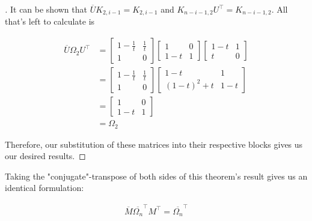 \begin{proof}[\cite{Kassel}]
It can be shown that $\overline{U}K_{2,i-1} = K_{2,i-1}$ and $K_{n-i-1,2}U^\intercal=K_{n-i-1,2}$. All that's left to calculate is 


\begin{equation}
	\begin{aligned}
		\overline{U}\Omega_2U^\intercal &= \begin{bmatrix}
													1-\frac{1}{t} & \frac{1}{t}\\
													1 & 0 
													\end{bmatrix}
													\begin{bmatrix}
													1 & 0\\
													1-t & 1 
													\end{bmatrix}
													\begin{bmatrix}
													1-t & 1\\
													t & 0 
													\end{bmatrix}\\
												&= \begin{bmatrix}
													1-\frac{1}{t} & \frac{1}{t}\\
													1 & 0 
													\end{bmatrix}
													\begin{bmatrix}
													1-t & 1\\
													(1-t)^2 + t & 1-t 
													\end{bmatrix}\\
												&= \begin{bmatrix}
													1 & 0\\
													1-t & 1 
													\end{bmatrix} \\
												&= \Omega_2
	\end{aligned}
\end{equation}

Therefore, our substitution of these matrices into their respective blocks gives us our desired results. \end{proof} 

Taking the "conjugate"-transpose of both sides of this theorem's result gives us an identical formulation:

\begin{equation}
	\begin{aligned}
		\overline{M} \overline{\Omega_n}^\intercal M^\intercal = \overline{\Omega_n}^\intercal
	\end{aligned}
\end{equation}

